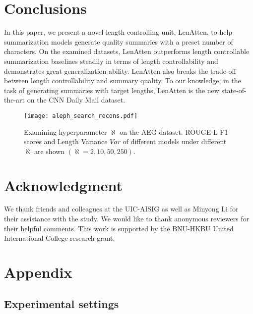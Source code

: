 \documentclass[11pt,a4paper]{article}
\begin{document}
\section{Conclusions}
In this paper, we present a novel length controlling unit, LenAtten, to help summarization models generate quality summaries with a preset number of characters. On the examined datasets, LenAtten outperforms length controllable summarization baselines steadily in terms of length controllability and demonstrates great generalization ability. LenAtten also breaks the trade-off between length controllability and summary quality. To our knowledge, in the task of generating summaries with target lengths, LenAtten is the new state-of-the-art on the CNN Daily Mail dataset.

\begin{figure}[t]
  \centering
  \texttt{[image: aleph\_search\_recons.pdf]}
  \caption{Examining hyperparameter $\aleph$ on the AEG dataset. ROUGE-L F1 scores and Length Variance $Var$ of different models under different $\aleph$ are shown $(\aleph = 2, 10, 50, 250)$.}
  \label{fig:aleph_search}
\end{figure}

\section*{Acknowledgment}
We thank friends and colleagues at the UIC-AISIG as well as Minyong Li for their assistance with the study. We would like to thank anonymous reviewers for their helpful comments. This work is supported by the BNU-HKBU United International College research grant.




\clearpage
\appendix
\section{Appendix}
\subsection{Experimental settings}
\end{document}
